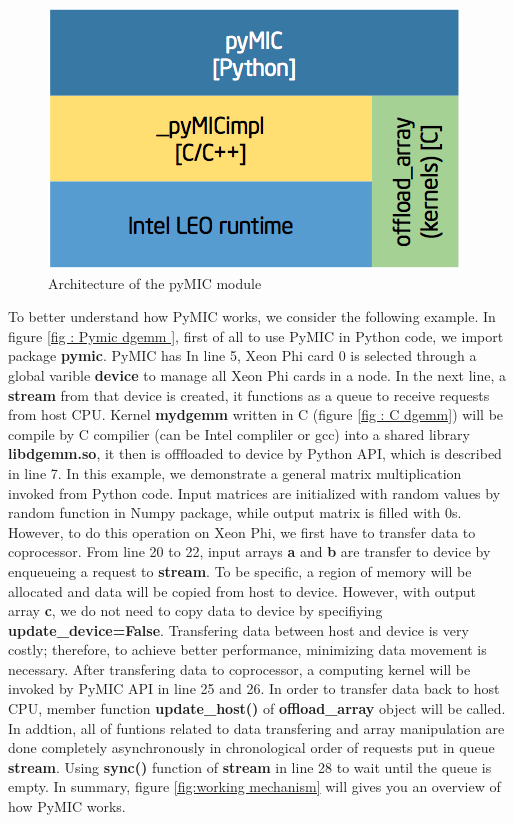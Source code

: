 \begin{figure}[h]
\centering
\includegraphics[scale=0.5]{img/pymic-arch.png}
\caption{Architecture of the pyMIC module}
\label{fig:pymic-arch}
\end{figure}

To better understand how PyMIC works, we consider the following example. In figure \ref{fig : Pymic dgemm }, first of all to use PyMIC in Python code, we import package \textbf{pymic}. PyMIC has  In line 5, Xeon Phi card 0 is selected through a global varible \textbf{device} to manage all Xeon Phi cards in a node. In the next line, a \textbf{stream} from that device is created, it functions as a queue to receive requests from host CPU. Kernel \textbf{mydgemm} written in C (figure \ref{fig : C dgemm}) will be compile by C compilier (can be Intel compliler or gcc) into a shared library \textbf{libdgemm.so}, it then is offfloaded to device by Python API, which is described in line 7. In this example, we demonstrate a general matrix multiplication invoked from Python code. Input matrices are initialized  with random values by random function in Numpy package, while output matrix is filled with 0s. However, to do this operation on Xeon Phi, we first have to transfer data to coprocessor. From line 20 to 22, input arrays \textbf{a} and \textbf{b} are transfer to device by enqueueing a request to \textbf{stream}. To be specific, a region of memory will be allocated and data will be copied from host to device. However, with output array \textbf{c}, we do not need to copy data to device by specifiying \textbf{update\_device=False}. Transfering data between host and device is very costly; therefore, to achieve better performance, minimizing data movement is necessary. After transfering data to coprocessor, a computing kernel will be invoked by PyMIC API in line 25 and 26. In order to transfer data back to host CPU, member function \textbf{update\_host()} of \textbf{offload\_array} object will be called. In addtion, all of funtions related to data transfering and array manipulation are done completely asynchronously in chronological order of requests put in queue \textbf{stream}. Using \textbf{sync()} function  of \textbf{stream} in line 28 to wait until the queue is empty. In summary, figure \ref{fig:working mechanism} will gives you an overview of how PyMIC works.

